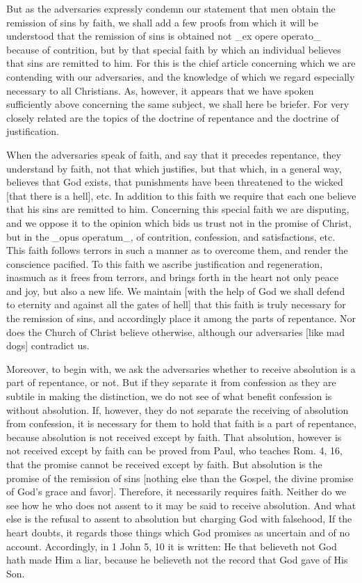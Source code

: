 But as the adversaries expressly condemn our statement that men
obtain the remission of sins by faith, we shall add a few proofs from
which it will be understood that the remission of sins is obtained
not _ex opere operato_ because of contrition, but by that special
faith by which an individual believes that sins are remitted to him.
For this is the chief article concerning which we are contending with
our adversaries, and the knowledge of which we regard especially
necessary to all Christians.  As, however, it appears that we have
spoken sufficiently above concerning the same subject, we shall here
be briefer.  For very closely related are the topics of the doctrine
of repentance and the doctrine of justification.

When the adversaries speak of faith, and say that it precedes
repentance, they understand by faith, not that which justifies, but
that which, in a general way, believes that God exists, that
punishments have been threatened to the wicked [that there is a hell],
etc. In addition to this faith we require that each one believe that
his sins are remitted to him.  Concerning this special faith we are
disputing, and we oppose it to the opinion which bids us trust not in
the promise of Christ, but in the _opus operatum_, of contrition,
confession, and satisfactions, etc. This faith follows terrors in
such a manner as to overcome them, and render the conscience pacified.
To this faith we ascribe justification and regeneration, inasmuch
as it frees from terrors, and brings forth in the heart not only
peace and joy, but also a new life.  We maintain [with the help of
God we shall defend to eternity and against all the gates of hell]
that this faith is truly necessary for the remission of sins, and
accordingly place it among the parts of repentance.  Nor does the
Church of Christ believe otherwise, although our adversaries [like
mad dogs] contradict us.

Moreover, to begin with, we ask the adversaries whether to receive
absolution is a part of repentance, or not.  But if they separate it
from confession as they are subtile in making the distinction, we do
not see of what benefit confession is without absolution.  If,
however, they do not separate the receiving of absolution from
confession, it is necessary for them to hold that faith is a part of
repentance, because absolution is not received except by faith.  That
absolution, however is not received except by faith can be proved
from Paul, who teaches Rom. 4, 16, that the promise cannot be
received except by faith.  But absolution is the promise of the
remission of sins [nothing else than the Gospel, the divine promise
of God's grace and favor].  Therefore, it necessarily requires faith.
Neither do we see how he who does not assent to it may be said to
receive absolution.  And what else is the refusal to assent to
absolution but charging God with falsehood, If the heart doubts, it
regards those things which God promises as uncertain and of no
account.  Accordingly, in 1 John 5, 10 it is written: He that
believeth not God hath made Him a liar, because he believeth not the
record that God gave of His Son.

